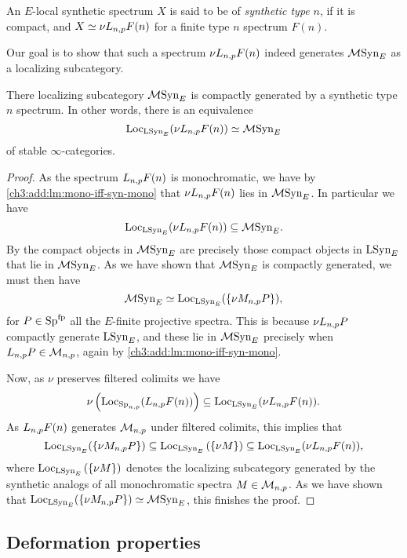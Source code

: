 \begin{definition}
    An $E$-local synthetic spectrum $X$ is said to be of \emph{synthetic type} $n$, if it is compact, and $X\simeq \nu L_{n,p} F(n)$ for a finite type $n$ spectrum $F(n)$. 
\end{definition}

Our goal is to show that such a spectrum $\nu L_{n,p} F(n)$ indeed generates $\mathcal{M}\mathrm{Syn}_{E}$ as a localizing subcategory. 

\begin{lemma}
    \label{ch3:add:monochromatic-synthetic-is-gen-by-type-n}
    There localizing subcategory $\mathcal{M}\mathrm{Syn}_{E}$ is compactly generated by a synthetic type $n$ spectrum. In other words, there is an equivalence 
    \[\operatorname{Loc}_{\mathrm{LSyn}_{E}}(\nu L_{n,p} F(n))\simeq \mathcal{M}\mathrm{Syn}_{E}\]
    of stable $\infty$-categories. 
\end{lemma}
\begin{proof}
    As the spectrum $L_{n,p} F(n)$ is monochromatic, we have by \cref{ch3:add:lm:mono-iff-syn-mono} that $\nu L_{n,p} F(n)$ lies in $\mathcal{M}\mathrm{Syn}_{E}$. In particular we have 
    \[\operatorname{Loc}_{\mathrm{LSyn}_{E}}(\nu L_{n,p} F(n))\subseteq \mathcal{M}\mathrm{Syn}_{E}.\]
    By \cite[2.2]{neeman_1992} the compact objects in $\mathcal{M}\mathrm{Syn}_{E}$ are precisely those compact objects in $\mathrm{LSyn}_{E}$ that lie in $\mathcal{M}\mathrm{Syn}_{E}$. As we have shown that $\mathcal{M}\mathrm{Syn}_{E}$ is compactly generated, we must then have 
    \[\mathcal{M}\mathrm{Syn}_{E} \simeq \operatorname{Loc}_{\mathrm{LSyn}_{E}}(\{\nu M_{n,p} P\}),\]
    for $P \in \mathrm{Sp}^{\mathrm{fp}}$ all the $E$-finite projective spectra. This is because $\nu L_{n,p} P$ compactly generate $\mathrm{LSyn}_{E}$, and these lie in $\mathcal{M}\mathrm{Syn}_{E}$ precisely when $L_{n,p} P\in \mathcal{M}_{n,p}$, again by \cref{ch3:add:lm:mono-iff-syn-mono}. 

    Now, as $\nu$ preserves filtered colimits we have 
    \[\nu \left(\operatorname{Loc}_{\mathrm{Sp}_{n,p}}(L_{n,p} F(n))\right)\subseteq \operatorname{Loc}_{\mathrm{LSyn}_{E}}(\nu L_{n,p} F(n)).\]
    As $L_{n,p} F(n)$ generates $\mathcal{M}_{n,p}$ under filtered colimits, this implies that 
    \[\operatorname{Loc}_{\mathrm{LSyn}_{E}}(\{\nu M_{n,p} P\})\subseteq \operatorname{Loc}_{\mathrm{LSyn}_{E}}\left(\{\nu M\}\right) \subseteq \operatorname{Loc}_{\mathrm{LSyn}_{E}}(\nu L_{n,p} F(n)),\]
    where $\operatorname{Loc}_{\mathrm{LSyn}_{E}}\left(\{\nu M\}\right)$ denotes the localizing subcategory generated by the synthetic analogs of all monochromatic spectra $M\in \mathcal{M}_{n,p}$. As we have shown that $\operatorname{Loc}_{\mathrm{LSyn}_{E}}(\{\nu M_{n,p} P\})\simeq \mathcal{M}\mathrm{Syn}_{E}$, this finishes the proof. 
\end{proof}



\subsection{Deformation properties}

